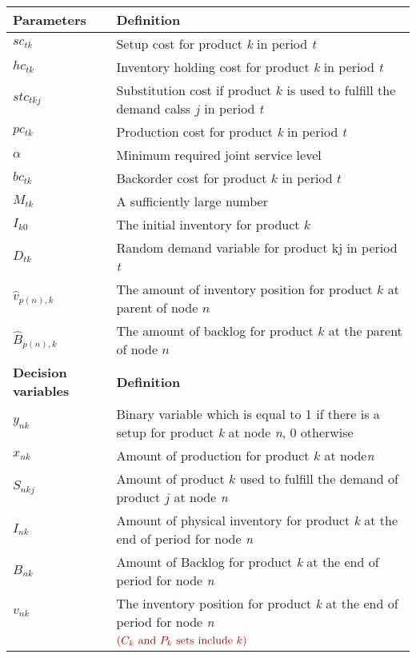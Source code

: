 \documentclass[10pt]{article}
\newcommand{\ti}{t} %
\newcommand{\ka}{k} %
\newcommand{\jey}{j} %
\newcommand{\Bi}{B} %
\newcommand{\Vi}{v} %
\newcommand{\Es}{S} %
\newcommand{\x}{x} %
\newcommand{\y}{y} %
\newcommand{\cred}{\color{red!65!black}}
\begin{document}
\begin{table}[H]
\begin{adjustbox}{width=1\textwidth,center=\textwidth}
\begin{tabular}{ll}
{\bf Parameters} & {\bf Definition} \\ \midrule
$sc_{\ti \ka}$ & Setup cost for product {\it k} in period {\it t} \\ 
$hc_{\ti \ka}$  & Inventory holding cost for product {\it k} in period {\it t}  \\ 
$stc_{\ti \ka \jey }$  & Substitution cost if product $\ka$  is used to fulfill the demand calss $j$ in period {\it t}  \\ 
$pc_{\ti \ka}$  & Production cost for product {\it k} in period {\it t}  \\
$\alpha$  & Minimum required joint service level \\ 
$bc_{\ti \ka}$  & Backorder cost for product $\ka$  in period $\ti$ \\
$M_{\ti \ka}$  & A sufficiently large number \\ 
$I_{k0}$ & The initial inventory for product $\ka$  \\ 
${D}_{\ti \ka}$ & Random demand variable for product {\ka j} in period {\it t}  \\ 
$\hat{\Vi}_{p(n), \ka} $&  The amount of inventory position for product $\ka$ at parent of node $n$\\
$\hat{\Bi}_{p(n), \ka} $&  The amount of backlog for product $\ka$ at the parent of node $n$  \\
{\bf Decision variables} & {\bf Definition} \\ \midrule
$\y_{n \ka}$ & Binary variable which is equal to 1 if there is a setup for product {\it k} at node {\it n}, 0 otherwise \\ 
$\x_{n \ka}$ & Amount of production for product $\ka$  at node{\it n}  \\ 
$\Es_{n \ka \jey}$ & Amount of product $\ka$  used to fulfill the demand of product $\jey$  at  node {\it n}   \\
${I}_{n \ka}$ & Amount of physical inventory for product {\it k} at the end of period for node {\it n}  \\
${\Bi}_{n \ka}$ & Amount of Backlog for product {\it k} at the end of period for node {\it n}  \\
${\Vi}_{n \ka}$ & The inventory position for product {\it \ka} at the end of period for node {\it n}  \\
 \bottomrule
 & ${\cred (C_k \text{ and } P_k  \text{ sets include } k) }$
\end{tabular}
\end{adjustbox}
 \label{tab:Sub_parameters}
\end{table}
\end{document}
